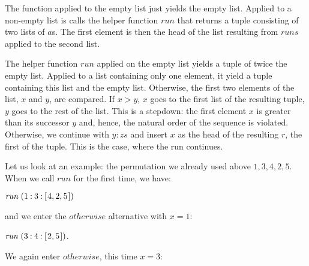 \documentclass{scrreprt}
\newcommand{\Varid}[1]{\mathit{#1}}
\def\resethooks{%
  \global\let\SaveRestoreHook\empty
  \global\let\ColumnHook\empty}
\begin{document}
\begin{minipage}{\textwidth}
\)\par\noindent\endgroup\resethooks
\end{minipage}

The function applied to the empty list
just yields the empty list. 
Applied to a non-empty list is calls the helper function \ensuremath{\Varid{run}}
that returns a tuple consisting of two lists of \ensuremath{\Varid{a}}s. 
The first element is then the head of the list
resulting from \ensuremath{\Varid{runs}} applied to the second list.

The helper function \ensuremath{\Varid{run}} applied on the empty list
yields a tuple of twice the empty list.
Applied to a list containing only one element,
it yield a tuple containing this list and the empty list.
Otherwise, the first two elements of the list, $x$ and $y$, 
are compared.
If $x > y$, $x$ goes to the first list of the resulting tuple,
$y$ goes to the rest of the list.
This is a stepdown: the first element $x$ is greater than 
its successor $y$
and, hence, the natural order of the sequence is violated.
Otherwise, we continue with \ensuremath{\Varid{y}\mathbin{:}\Varid{zs}} and insert $x$
as the head of the resulting $r$, the first of the tuple.
This is the case, where the run continues.

Let us look at an example: the permutation
we already used above $1,3,4,2,5$.
When we call \ensuremath{\Varid{run}} for the first time, we have:

\ensuremath{\Varid{run}\;(\mathrm{1}\mathbin{:}\mathrm{3}\mathbin{:}[\mskip1.5mu \mathrm{4},\mathrm{2},\mathrm{5}\mskip1.5mu])}

and we enter the \ensuremath{\Varid{otherwise}} alternative with $x=1$:

\ensuremath{\Varid{run}\;(\mathrm{3}\mathbin{:}\mathrm{4}\mathbin{:}[\mskip1.5mu \mathrm{2},\mathrm{5}\mskip1.5mu])}.

We again enter \ensuremath{\Varid{otherwise}}, this time $x=3$:
\end{document}
